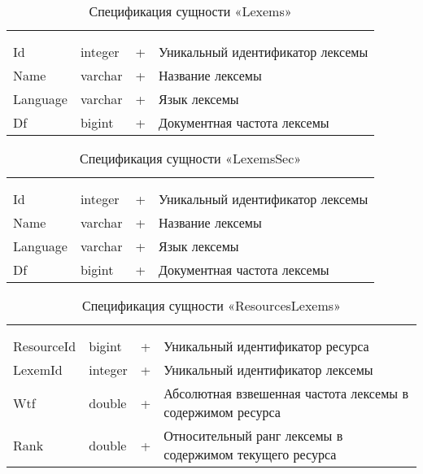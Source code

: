 \begin{xltabular}{\textwidth}{|X|X|X|X|}
	\caption{Спецификация сущности «Lexems»}\label{indexer_lexems:table}\\ \hline
	 &  &  &  \\ \hline
	 &  &  &  \\ \hline
	\endfirsthead
	 \hline
	 &  &  &  \\ \hline
	\endhead
	Id & integer & + & Уникальный идентификатор лексемы \\ \hline
	Name & varchar & + & Название лексемы \\ \hline
	Language & varchar & + & Язык лексемы \\ \hline
	Df & bigint & + & Документная частота лексемы \\ \hline
\end{xltabular}

\begin{xltabular}{\textwidth}{|X|X|X|X|}
	\caption{Спецификация сущности «LexemsSec»}\label{indexer_lexems_sec:table}\\ \hline
	 &  &  &  \\ \hline
	 &  &  &  \\ \hline
	\endfirsthead
	 \hline
	 &  &  &  \\ \hline
	\endhead
	Id & integer & + & Уникальный идентификатор лексемы \\ \hline
	Name & varchar & + & Название лексемы \\ \hline
	Language & varchar & + & Язык лексемы \\ \hline
	Df & bigint & + & Документная частота лексемы \\ \hline
\end{xltabular}

\begin{xltabular}{\textwidth}{|X|X|X|X|}
	\caption{Спецификация сущности «ResourcesLexems»}\label{indexer_resources_lexems:table}\\ \hline
	 &  &  &  \\ \hline
	 &  &  &  \\ \hline
	\endfirsthead
	 \hline
	 &  &  &  \\ \hline
	\endhead
	ResourceId & bigint & + & Уникальный идентификатор ресурса \\ \hline
	LexemId & integer & + & Уникальный идентификатор лексемы \\ \hline
	Wtf & double & + & Абсолютная взвешенная частота лексемы в содержимом ресурса \\ \hline
	Rank & double & + & Относительный ранг лексемы в содержимом текущего ресурса \\ \hline
\end{xltabular}

